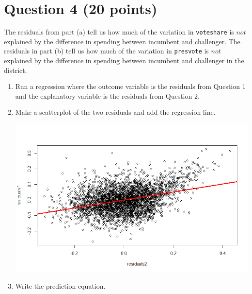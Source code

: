 \documentclass[12pt,letterpaper]{article}
\begin{document}
\section*{Question 4 (20 points)}
\noindent The residuals from part (a) tell us how much of the variation in \texttt{voteshare} is $not$ explained by the difference in spending between incumbent and challenger. The residuals in part (b) tell us how much of the variation in \texttt{presvote} is $not$ explained by the difference in spending between incumbent and challenger in the district.
	\begin{enumerate}
		\item Run a regression where the outcome variable is the residuals from Question 1 and the explanatory variable is the residuals from Question 2.	
		
		 
		
		\vspace{6cm}
		\item Make a scatterplot of the two residuals and add the regression line. 	
		
		 
		\includegraphics[scale=.75]{plot4.png}
		
		\vspace{6cm}
		\item Write the prediction equation.
		
		 
		
	\end{enumerate}
	
	\newpage	
\end{document}
